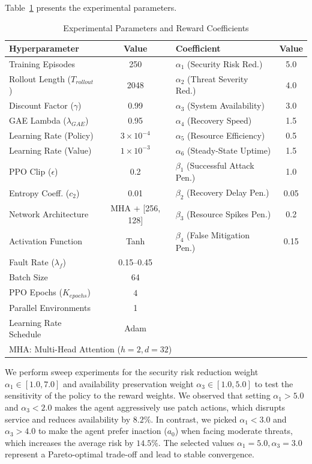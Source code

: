\documentclass[pdflatex,sn-mathphys-num]{sn-jnl}%
\theoremstyle{thmstyleone}%
\theoremstyle{thmstyletwo}%
\theoremstyle{thmstylethree}%
\begin{document}
	Table~\ref{tab:parameters} presents the experimental parameters.
	
	\begin{table}[h]
		\centering
		\caption{Experimental Parameters and Reward Coefficients}
		\label{tab:parameters}
		\scriptsize
		\setlength{\tabcolsep}{2.5pt}
		\begin{tabular}{@{}lc|lc@{}}
			\toprule
			\textbf{Hyperparameter} & \textbf{Value} & \textbf{Coefficient} & \textbf{Value} \\
			\midrule
			Training Episodes & 250 & $\alpha_1$ (Security Risk Red.) & 5.0 \\
			Rollout Length ($T_{rollout}$) & 2048 & $\alpha_2$ (Threat Severity Red.) & 4.0 \\
			Discount Factor ($\gamma$) & 0.99 & $\alpha_3$ (System Availability) & 3.0 \\
			GAE Lambda ($\lambda_{GAE}$) & 0.95 & $\alpha_4$ (Recovery Speed) & 1.5 \\
			Learning Rate (Policy) & $3 \times 10^{-4}$ & $\alpha_5$ (Resource Efficiency) & 0.5 \\
			Learning Rate (Value) & $1 \times 10^{-3}$ & $\alpha_6$ (Steady-State Uptime) & 1.5 \\
			PPO Clip ($\epsilon$) & 0.2 & $\beta_1$ (Successful Attack Pen.) & 1.0 \\
			Entropy Coeff. ($c_2$) & 0.01 & $\beta_2$ (Recovery Delay Pen.) & 0.05 \\
			Network Architecture & MHA + [256, 128] & $\beta_3$ (Resource Spikes Pen.) & 0.2 \\
			Activation Function & Tanh & $\beta_4$ (False Mitigation Pen.) & 0.15 \\
			Fault Rate ($\lambda_f$) & 0.15--0.45 & & \\
			Batch Size & 64 & & \\
			PPO Epochs ($K_{epochs}$) & 4 & & \\
			Parallel Environments & 1 & & \\
			Learning Rate Schedule & Adam & & \\
			\bottomrule
			\multicolumn{4}{l}{\scriptsize *MHA: Multi-Head Attention ($h=2, d=32$)}
		\end{tabular}
	\end{table}
	
	We perform sweep experiments for the security risk reduction weight $\alpha_1 \in [1.0, 7.0]$ and availability preservation weight $\alpha_3 \in [1.0, 5.0]$ to test the sensitivity of the policy to the reward weights. We observed that setting $\alpha_1 > 5.0$ and $\alpha_3 < 2.0$ makes the agent aggressively use patch actions, which disrupts service and reduces availability by $8.2\%$. In contrast, we picked $\alpha_1 < 3.0$ and $\alpha_3 > 4.0$ to make the agent prefer inaction ($a_0$) when facing moderate threats, which increases the average risk by $14.5\%$. The selected values $\alpha_1=5.0, \alpha_3=3.0$ represent a Pareto-optimal trade-off and lead to stable convergence. 
	
\end{document}
